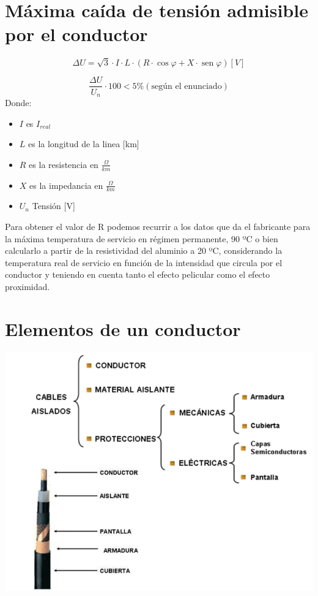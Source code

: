 \documentclass[10pt,a4paper]{article}
\begin{document}
\newpage
\section{Máxima caída de tensión admisible por el conductor}
$$
\Delta U=\sqrt{3} \cdot I \cdot L \cdot(R \cdot \cos \varphi+X \cdot \operatorname{sen} \varphi) [V]
$$

$$
\frac{\Delta U}{U_n} \cdot 100 < 5\% (\text{según el enunciado})
$$
Donde:
\begin{itemize}
    \item $I$ es $I_{real}$
    \item $L$ es la longitud de la linea [km]
    \item $R$ es la resistencia en $\frac{\Omega}{km}$
    \item $X$ es la impedancia en $\frac{\Omega}{km}$
    \item $U_n$ Tensión [V]
\end{itemize}
Para obtener el valor de R podemos recurrir a los datos que da el fabricante para la máxima temperatura de servicio en régimen permanente, 90 ºC o bien calcularlo a partir de la resistividad del aluminio a 20 ºC, considerando la temperatura real de servicio en función de la intensidad que circula por el conductor y teniendo en cuenta tanto el efecto pelicular como el efecto proximidad.

\section{Elementos de un conductor}
\begin{center}
    \includegraphics[scale = 0.8]{Elementos.png}
\end{center}
\end{document}
